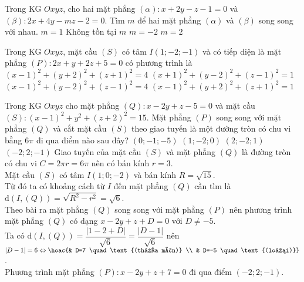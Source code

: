 \begin{ex}%
	Trong KG $Oxyz$, cho hai mặt phẳng $\left(\alpha \right)\colon  x+2y-z-1=0$ và $\left(\beta \right)\colon  2x+4y-mz-2=0$. Tìm $m$ để hai mặt phẳng $\left(\alpha \right)$ và $\left(\beta \right)$ song song với nhau.
	\choice
	{$m=1$}
	{\True Không tồn tại $m$}
	{$m=-2$}
	{$m=2$}
\end{ex}
\begin{ex}%
	Trong KG $Oxyz$, mặt cầu $(S)$ có tâm $I(1;-2;-1)$ và có tiếp diện là mặt phẳng $(P)\colon 2x+y+2z+5=0$ có phương trình là
	\choice
	{$(x-1)^2+(y+2)^2+(z+1)^2=4$}
	{$(x+1)^2+(y-2)^2+(z-1)^2=1$}
	{$(x-1)^2+(y-2)^2+(z-1)^2=4$}
	{\True $(x-1)^2+(y+2)^2+(z+1)^2=1$}
\end{ex}
\begin{ex}%
	Trong KG $Oxyz$ cho mặt phẳng $(Q)\colon x-2y+z-5=0$ và mặt cầu $(S)\colon (x-1)^2+y^2+(z+2)^2=15$. Mặt phẳng $(P)$ song song với mặt phẳng $(Q)$ và cắt mặt cầu $(S)$ theo giao tuyến là một đường tròn có chu vi bằng $6\pi$ đi qua điểm nào sau đây?
	\choice
	{$(0;-1;-5)$}
	{$(1;-2;0)$}
	{$(2;-2;1)$}
	{\True $(-2;2;-1)$}
	\loigiai
	{Giao tuyến của mặt cầu $(S)$ và mặt phẳng $(Q)$ là đường tròn có chu vi $C=2\pi r=6\pi$ nên có bán kính $r=3$.\\
		Mặt cầu $(S)$ có tâm $I(1;0;-2)$ và bán kính $R=\sqrt{15}$.\\
		Từ đó ta có khoảng cách từ $I$ đến mặt phẳng $(Q)$ cần tìm là $\mathrm{d}(I,(Q))=\sqrt{R^2-r^2}=\sqrt{6}$.\\
		Theo bài ra mặt phẳng $(Q)$ song song với mặt phẳng $(P)$ nên phương trình mặt phẳng $(Q)$ có dạng $x-2y+z+D=0$ với $D\neq -5$.\\
		Ta có $\mathrm{d}(I,(Q))=\dfrac{|1-2+D|}{\sqrt{6}}=\dfrac{|D-1|}{\sqrt{6}}$ nên $|D-1|=6\Leftrightarrow\hoac{& D=7 \quad \text{(thỏa mãn)} \\ & D=-5 \quad \text{(loại)}}$.\\
		Phương trình mặt phẳng $(P)\colon x-2y+z+7=0$ đi qua điểm $(-2;2;-1)$.
	}
\end{ex}

